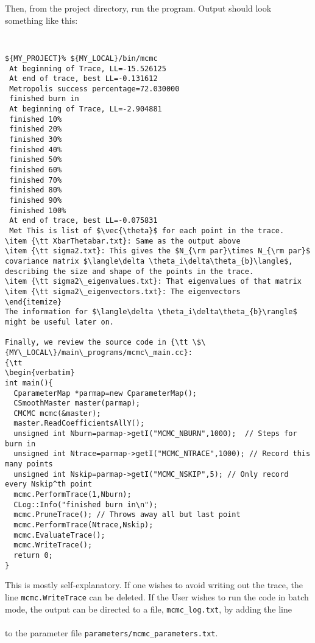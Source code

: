 \documentclass[UserManual.tex]{subfiles}
\begin{document}
Then, from the project directory, run the program. Output should look something like this:
{\tt
\begin{verbatim}
${MY_PROJECT}% ${MY_LOCAL}/bin/mcmc
 At beginning of Trace, LL=-15.526125
 At end of trace, best LL=-0.131612
 Metropolis success percentage=72.030000
 finished burn in
 At beginning of Trace, LL=-2.904881
 finished 10%
 finished 20%
 finished 30%
 finished 40%
 finished 50%
 finished 60%
 finished 70%
 finished 80%
 finished 90%
 finished 100%
 At end of trace, best LL=-0.075831
 Met This is list of $\vec{\theta}$ for each point in the trace.
\item {\tt XbarThetabar.txt}: Same as the output above
\item {\tt sigma2.txt}: This gives the $N_{\rm par}\times N_{\rm par}$ covariance matrix $\langle\delta \theta_i\delta\theta_{b}\langle$, describing the size and shape of the points in the trace.
\item {\tt sigma2\_eigenvalues.txt}: That eigenvalues of that matrix
\item {\tt sigma2\_eigenvectors.txt}: The eigenvectors
\end{itemize}
The information for $\langle\delta \theta_i\delta\theta_{b}\rangle$ might be useful later on.

Finally, we review the source code in {\tt \$\{MY\_LOCAL\}/main\_programs/mcmc\_main.cc}:
{\tt
\begin{verbatim}
int main(){
  CparameterMap *parmap=new CparameterMap();
  CSmoothMaster master(parmap);  
  CMCMC mcmc(&master);
  master.ReadCoefficientsAllY();
  unsigned int Nburn=parmap->getI("MCMC_NBURN",1000);  // Steps for burn in
  unsigned int Ntrace=parmap->getI("MCMC_NTRACE",1000); // Record this many points
  unsigned int Nskip=parmap->getI("MCMC_NSKIP",5); // Only record every Nskip^th point  
  mcmc.PerformTrace(1,Nburn);  
  CLog::Info("finished burn in\n");
  mcmc.PruneTrace(); // Throws away all but last point
  mcmc.PerformTrace(Ntrace,Nskip);
  mcmc.EvaluateTrace();
  mcmc.WriteTrace();
  return 0;
}
\end{verbatim}}
This is mostly self-explanatory. If one wishes to avoid writing out the trace, the line {\tt mcmc.WriteTrace} can be deleted. If the User wishes to run the code in batch mode, the output can be directed to a file, {\tt mcmc\_log.txt}, by adding the line\\
\hspace*{20pt}{\tt MCMC\_LogFileName mcmc\_log.txt} \\
to the parameter file {\tt parameters/mcmc\_parameters.txt}.






 
\end{document}
